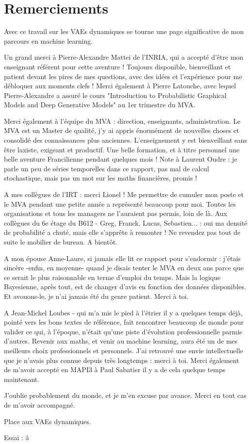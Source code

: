 \chapter{Remerciements}\label{sec:Remerciements}

Avec ce travail sur les VAEs dynamiques se tourne une page significative de mon parcours en machine learning.

Un grand merci à Pierre-Alexandre Mattei de l'INRIA, qui a accepté d'être mon enseignant référent pour cette aventure !
Toujours disponible, bienveillant et patient devant les pires de mes questions, avec des idées et l'expérience 
pour me débloquer aux moments clefs ! Merci également à Pierre Latouche, avec lequel Pierre-Alexandre a assuré 
le cours "Introduction to Probabilistic Graphical Models and Deep Generative Models" au 1er trimestre du MVA.

Merci également à l'équipe du MVA : direction, enseignants, administration. Le MVA est un Master de qualité, j'y ai appris 
énormément de nouvelles choses et consolidé des connaissances plus anciennes. L'enseignement y est bienveillant sans 
\^etre laxiste, exigeant et productif. Une belle formation, et à titre personnel une belle aventure Francilienne 
pendant quelques mois ! Note à Laurent Oudre : je parle un peu de séries temporelles dans ce rapport, pas mal de 
calcul stochastique, mais pas un mot sur les maths financières, promis !

A mes collègues de l'IRT : merci Lionel ! Me permettre de cumuler mon poste et le MVA pendant une petite année a 
représenté beaucoup pour moi. Toutes les organisations et tous les managers ne l'auraient pas permis, loin de là. 
Aux collègues du 6e étage du B612 - Greg, Franck, Lucas, Sebastien... : oui ma densité de probabilité a chuté, 
mais elle s'apprête à remonter ! Ne revendez pas tout de suite le mobilier de bureau. A bientôt.

A mon épouse Anne-Laure, si jamais elle lit ce rapport pour s'endormir : j'étais sincère -enfin, en moyenne- 
quand je disais tenter le MVA en deux ans parce que ce serait le plus raisonnable en terme d'emploi du temps. 
Mais la logique Bayesienne, après tout, est de changer d'avis en fonction des données disponibles. 
Et avouons-le, je n'ai jamais été du genre patient. Merci à toi.

A Jean-Michel Loubes - qui m'a mis le pied à l'étrier il y a quelques temps déjà, pointé vers les bons textes de référence, fait 
rencontrer beaucoup de monde pour valider ce qui, à l'époque, n'était qu'une piste d'évolution professionnelle parmis d'autres. 
Revenir aux maths, et venir au machine learning, aura été un de mes meilleurs choix professionnels et personnels. 
J'ai retrouvé une envie intellectuelle que je n'avais plus connue depuis très longtemps : merci à toi. 
Merci également de m'avoir accepté en MAPI3 à Paul Sabatier il y a de cela quelque temps maintenant.

J'oublie probablement du monde, et je m'en excuse par avance. Merci en tout cas de m'avoir accompagné.

Place aux VAEs dynamiques.

Essai : \^a
